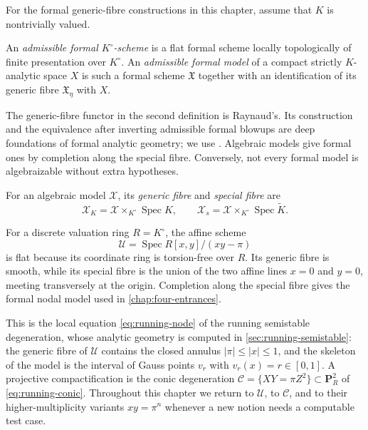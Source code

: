 For the formal generic-fibre constructions in this chapter, assume that
$K$ is nontrivially valued.

\begin{definition}\label{def:admissible-formal-model}
An \emph{admissible formal $K^\circ$-scheme} is a flat formal scheme locally
topologically of finite presentation over $K^\circ$. An \emph{admissible
formal model} of a compact strictly $K$-analytic space $X$ is such a formal
scheme $\mathfrak X$ together with an identification of its generic fibre
$\mathfrak X_\eta$ with $X$.
\end{definition}

The generic-fibre functor in the second definition is Raynaud's. Its
construction and the equivalence after inverting admissible formal blowups
are deep foundations of formal analytic geometry; we use
\cite[Chapter~1]{Berk12}. Algebraic models give formal ones by completion
along the special fibre. Conversely, not every formal model is algebraizable
without extra hypotheses.

\begin{definition}\label{def:model-generic-special-fibres}
For an algebraic model $\mathcal X$, its \emph{generic fibre} and
\emph{special fibre} are
\[
 \mathcal X_K=\mathcal X\times_{K^\circ}\operatorname{Spec}K,\qquad
 \mathcal X_s=\mathcal X\times_{K^\circ}\operatorname{Spec}\widetilde K.
\]
\end{definition}

\begin{example}
\label{ex:nodal-model}
For a discrete valuation ring $R=K^\circ$, the affine scheme
\[
            \mathcal U=\operatorname{Spec}R[x,y]/(xy-\pi)
\]
is flat because its coordinate ring is torsion-free over $R$. Its generic
fibre is smooth, while its special fibre is the union of the two affine lines
$x=0$ and $y=0$, meeting transversely at the origin. Completion along the
special fibre gives the formal nodal model used in
\cref{chap:four-entrances}.

This is the local equation \eqref{eq:running-node} of the running
semistable degeneration, whose analytic geometry is computed in
\cref{sec:running-semistable}: the generic fibre of $\mathcal U$ contains
the closed annulus $|\pi|\leq|x|\leq1$, and the skeleton of the model is the
interval of Gauss points $v_r$ with $v_r(x)=r\in[0,1]$.  A projective
compactification is the conic degeneration
$\mathcal C=\{XY=\pi Z^2\}\subset\mathbf P^2_R$ of \eqref{eq:running-conic}.
Throughout this chapter we return to $\mathcal U$, to $\mathcal C$, and to
their higher-multiplicity variants $xy=\pi^n$ whenever a new notion needs a
computable test case.
\end{example}

